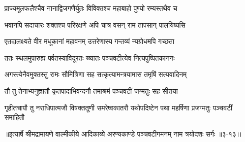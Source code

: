 \twolineshloka
{प्राज्यमूलफलैश्चैव नानाद्विजगणैर्युतः}
{विविक्तश्च महाबाहो पुण्यो रम्यस्तथैव च} %

\twolineshloka
{भवानपि सदाचारः शक्तश्च परिरक्षणे}
{अपि चात्र वसन् राम तापसान् पालयिष्यसि} %

\twolineshloka
{एतदालक्ष्यते वीर मधूकानां महावनम्}
{उत्तरेणास्य गन्तव्यं न्यग्रोधमपि गच्छता} %

\twolineshloka
{ततः स्थलमुपारुह्य पर्वतस्याविदूरतः}
{ख्यातः पञ्चवटीत्येव नित्यपुष्पितकाननः} %

\twolineshloka
{अगस्त्येनैवमुक्तस्तु रामः सौमित्रिणा सह}
{सत्कृत्यामन्त्रयामास तमृषिं सत्यवादिनम्} %

\twolineshloka
{तौ तु तेनाभ्यनुज्ञातौ कृतपादाभिवन्दनौ}
{तमाश्रमं पञ्चवटीं जग्मतुः सह सीतया} %

\twolineshloka
{गृहीतचापौ तु नराधिपात्मजौ विषक्ततूणी समरेष्वकातरौ}
{यथोपदिष्टेन पथा महर्षिणा प्रजग्मतुः पञ्चवटीं समाहितौ} %


॥इत्यार्षे श्रीमद्रामायणे वाल्मीकीये आदिकाव्ये अरण्यकाण्डे पञ्चवटीगमनम् नाम त्रयोदशः सर्गः ॥३-१३॥
